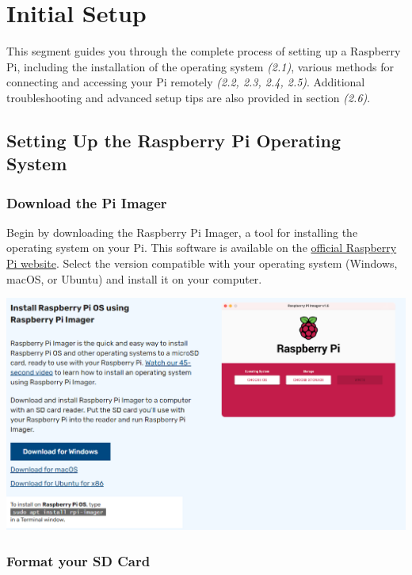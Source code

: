 \documentclass[
  letterpaper,
]{scrbook}
\begin{document}
\chapter{Initial Setup}\label{initial-setup}

This segment guides you through the complete process of setting up a
Raspberry Pi, including the installation of the operating system
\emph{(2.1)}, various methods for connecting and accessing your Pi
remotely \emph{(2.2, 2.3, 2.4, 2.5)}. Additional troubleshooting and
advanced setup tips are also provided in section \emph{(2.6)}.

\section{Setting Up the Raspberry Pi Operating
System}\label{setting-up-the-raspberry-pi-operating-system}

\subsection{Download the Pi Imager}\label{download-the-pi-imager}

Begin by downloading the Raspberry Pi Imager, a tool for installing the
operating system on your Pi. This software is available on the
\href{https://www.raspberrypi.com/software/}{official Raspberry Pi
website}. Select the version compatible with your operating system
(Windows, macOS, or Ubuntu) and install it on your computer.

\includegraphics{content/material/ch2/raspi_imager.png}

\subsection{Format your SD Card}\label{format-your-sd-card}
\end{document}
